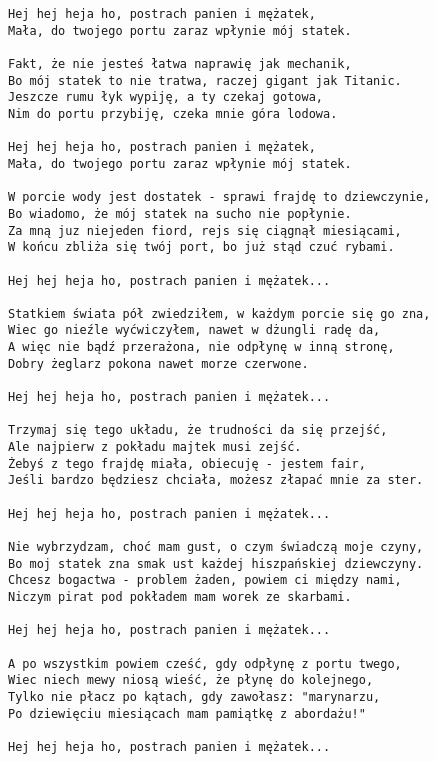 \documentclass[12pt]{article}
\begin{document}
\begin{verbatim}
Hej hej heja ho, postrach panien i mężatek,
Mała, do twojego portu zaraz wpłynie mój statek.

Fakt, że nie jesteś łatwa naprawię jak mechanik,
Bo mój statek to nie tratwa, raczej gigant jak Titanic.
Jeszcze rumu łyk wypiję, a ty czekaj gotowa,
Nim do portu przybiję, czeka mnie góra lodowa.

Hej hej heja ho, postrach panien i mężatek,
Mała, do twojego portu zaraz wpłynie mój statek.

W porcie wody jest dostatek - sprawi frajdę to dziewczynie,
Bo wiadomo, że mój statek na sucho nie popłynie.
Za mną juz niejeden fiord, rejs się ciągnął miesiącami,
W końcu zbliża się twój port, bo już stąd czuć rybami.

Hej hej heja ho, postrach panien i mężatek...

Statkiem świata pół zwiedziłem, w każdym porcie się go zna,
Wiec go nieźle wyćwiczyłem, nawet w dżungli radę da,
A więc nie bądź przerażona, nie odpłynę w inną stronę,
Dobry żeglarz pokona nawet morze czerwone.

Hej hej heja ho, postrach panien i mężatek...

Trzymaj się tego układu, że trudności da się przejść,
Ale najpierw z pokładu majtek musi zejść.
Żebyś z tego frajdę miała, obiecuję - jestem fair,
Jeśli bardzo będziesz chciała, możesz złapać mnie za ster.

Hej hej heja ho, postrach panien i mężatek...

Nie wybrzydzam, choć mam gust, o czym świadczą moje czyny,
Bo moj statek zna smak ust każdej hiszpańskiej dziewczyny.
Chcesz bogactwa - problem żaden, powiem ci między nami,
Niczym pirat pod pokładem mam worek ze skarbami.

Hej hej heja ho, postrach panien i mężatek...

A po wszystkim powiem cześć, gdy odpłynę z portu twego,
Wiec niech mewy niosą wieść, że płynę do kolejnego,
Tylko nie płacz po kątach, gdy zawołasz: "marynarzu,
Po dziewięciu miesiącach mam pamiątkę z abordażu!"

Hej hej heja ho, postrach panien i mężatek...
\end{verbatim}
\clearpage
\end{document}
